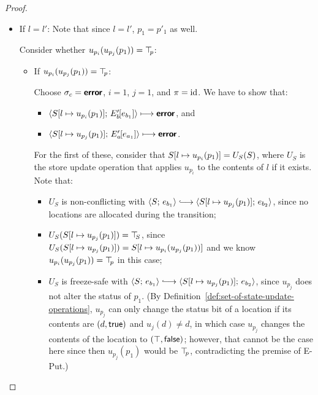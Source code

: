 \begin{proof}
\begin{enumerate}
\begin{enumerate}
\begin{itemize}
        \item If $l = l'$:
          Note that since $l = l'$, $p_1 = p'_1$ as well.

          Consider whether $u_{p_i}(u_{p_j}(p_1)) = \top\hspace{-0.85mm}_{p}$:
          \begin{itemize}
          \item If $u_{p_i}(u_{p_j}(p_1)) = \top\hspace{-0.85mm}_{p}$:

            Choose $\sigma_c = \textbf{\textsf{error}}$, $i = 1$, $j = 1$, and $\pi =
            \mathrm{id}$.  We have to show that:

            \begin{itemize}
            \item
              $\langle S[l \mapsto u_{p_i}(p_1)];\, E'_b\hspace{-1mm}\left[e_{b_1}\right] \rangle
              \longmapsto \textbf{\textsf{error}}$, and
            \item
              $\langle S[l \mapsto u_{p_j}(p_1)];\, E'_a\hspace{-1mm}\left[e_{a_1}\right] \rangle
              \longmapsto \textbf{\textsf{error}}$.
            \end{itemize}

            For the first of these, consider that
            $S[l \mapsto u_{p_i}(p_1)] = U_S(S)$, where $U_S$ is the
            store update operation that applies $u_{p_i}$ to the
            contents of $l$ if it exists.  Note that:
            \begin{itemize}
            \item $U_S$ is non-conflicting with $\config{S}{e_{b_1}}
              \parstepsto
              \config{\extSRaw{S}{l}{u_{p_j}(p_1)}}{e_{b_2}}$, since
              no locations are allocated during the transition;
            \item $U_S(S[l \mapsto u_{p_j}(p_1)]) = \top\hspace{-0.85mm}_{S}$, since
              $U_S(S[l \mapsto u_{p_j}(p_1)]) =
              S[l \mapsto u_{p_i}(u_{p_j}(p_1))]$ and we know
              $u_{p_i}(u_{p_j}(p_1)) = \top\hspace{-0.85mm}_{p}$ in this case;
            \item $U_S$ is freeze-safe with $\config{S}{e_{b_1}}
              \parstepsto
              \config{\extSRaw{S}{l}{u_{p_j}(p_1)}}{e_{b_2}}$, since
              $u_{p_j}$ does not alter the status of $p_1$.  (By
              Definition~\ref{def:set-of-state-update-operations},
              $u_{p_j}$ can only change the status bit of a location if
              its contents are $(d, \textsf{true})$ and $u_j(d) \neq
              d$, in which case $u_{p_j}$ changes the contents of the
              location to $(\top, \textsf{false})$; however, that
              cannot be the case here since then $u_{p_j}(p_1)$ would be
              $\top\hspace{-0.85mm}_{p}$, contradicting the premise of {\sc E-Put}.)
            \end{itemize}


\end{itemize}
\end{itemize}
\end{enumerate}
\end{enumerate}
\end{proof}
